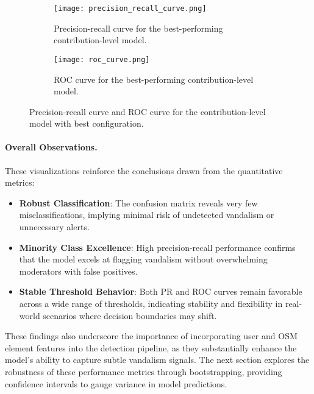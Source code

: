 \documentclass[
    13pt, %
    a4paper, %
    listof=totoc, %
    bibliography=totoc, %
    index=totoc, %
    headsepline
]{scrreprt}
\begin{document}
\begin{figure}[H]
    \centering
    \begin{subfigure}[t]{0.48\textwidth} %
        \centering
        \texttt{[image: precision\_recall\_curve.png]}
        \caption{Precision-recall curve for the best-performing contribution-level model.}
        \label{fig:precision_recall}
    \end{subfigure}
    \hfill %
    \begin{subfigure}[t]{0.48\textwidth}
        \centering
        \texttt{[image: roc\_curve.png]}
        \caption{ROC curve for the best-performing contribution-level model.}
        \label{fig:roc_curve}
    \end{subfigure}
    \caption{Precision-recall curve and ROC curve for the contribution-level model with best configuration.}
    \label{fig:pr_roc_combined}
\end{figure}


\paragraph{Overall Observations.}
These visualizations reinforce the conclusions drawn from the quantitative metrics:
\begin{itemize}
    \item \textbf{Robust Classification}: The confusion matrix reveals very few misclassifications, implying minimal risk of undetected vandalism or unnecessary alerts.
    \item \textbf{Minority Class Excellence}: High precision-recall performance confirms that the model excels at flagging vandalism without overwhelming moderators with false positives.
    \item \textbf{Stable Threshold Behavior}: Both PR and ROC curves remain favorable across a wide range of thresholds, indicating stability and flexibility in real-world scenarios where decision boundaries may shift.
\end{itemize}

These findings also underscore the importance of incorporating user and OSM element features into the detection pipeline, as they substantially enhance the model’s ability to capture subtle vandalism signals. The next section explores the robustness of these performance metrics through bootstrapping, providing confidence intervals to gauge variance in model predictions.
\end{document}

